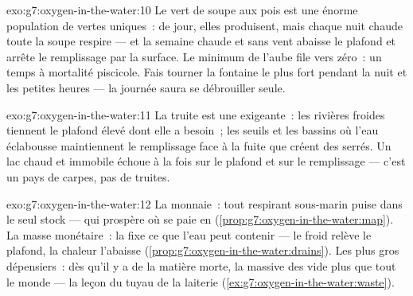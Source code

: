 \begin{solution}{exo:g7:oxygen-in-the-water:10}
Le vert de soupe aux pois est une énorme population de 
vertes uniques~: de jour, elles produisent, mais chaque nuit chaude
toute la soupe respire --- et la semaine chaude et sans vent abaisse
le plafond et arrête le remplissage par la surface. Le minimum de
l'aube file vers zéro~: un temps à mortalité piscicole. Fais tourner
la fontaine le plus fort pendant la nuit et les petites heures ---
la journée saura se débrouiller seule.
\end{solution}

\begin{solution}{exo:g7:oxygen-in-the-water:11}
La truite est une  exigeante~: les rivières froides tiennent
le plafond élevé dont elle a besoin~; les seuils et les bassins où
l'eau éclabousse maintiennent le remplissage face à la fuite que
créent des  serrés. Un lac chaud et immobile échoue à la
fois sur le plafond et sur le remplissage --- c'est un pays de
carpes, pas de truites.
\end{solution}

\begin{solution}{exo:g7:oxygen-in-the-water:12}
La monnaie~: tout respirant sous-marin puise dans le seul stock
 --- qui prospère où se paie en 
(\cref{prop:g7:oxygen-in-the-water:map}). La masse monétaire~: la
 fixe ce que l'eau peut contenir --- le froid relève le
plafond, la chaleur l'abaisse
(\cref{prop:g7:oxygen-in-the-water:drains}). Les plus gros
dépensiers~: dès qu'il y a de la matière morte, la 
massive des  vide plus que tout le monde --- la leçon du
tuyau de la laiterie (\cref{ex:g7:oxygen-in-the-water:waste}).
\end{solution}

